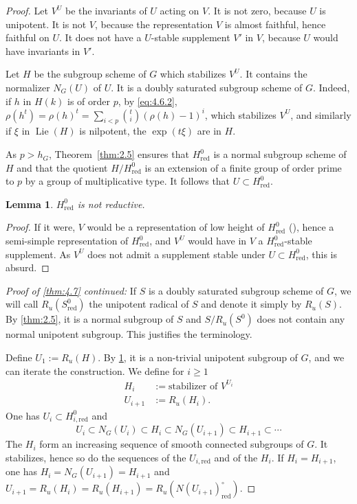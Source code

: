 \documentclass[11pt,a4paper]{article}
\theoremstyle{plain}
\newtheorem{lemma}[theorem]{Lemma}
\theoremstyle{definition}
\DeclareMathOperator{\Lie}{Lie}
\newcommand{\red}{\mathrm{red}}
\begin{document}
\begin{proof}
Let $V^U$ be the invariants of $U$ acting on $V$. It is not zero, because $U$ is unipotent. It is not $V$, because the representation $V$ is almost faithful, hence faithful on $U$. It does not have a $U$-stable supplement $V'$ in $V$, because $U$ would have invariants in $V'$.

Let $H$ be the subgroup scheme of $G$ which stabilizes $V^U$. It contains the normalizer $N_G(U)$ of $U$. It is a doubly saturated subgroup scheme of $G$. Indeed, if $h$ in $H(k)$ is of order $p$, by \eqref{eq:4.6.2}, $\rho(h^t) = \rho(h)^t = \sum_{i < p} \binom{t}{i} (\rho(h) - 1)^i$, which stabilizes $V^U$, and similarly if $\xi$ in $\Lie(H)$ is nilpotent, the $\exp(t\xi)$ are in $H$.

As $p > h_G$, Theorem~\ref{thm:2.5} ensures that $H^0_\red$ is a normal subgroup scheme of $H$ and that the quotient $H/H^0_\red$ is an extension of a finite group of order prime to $p$ by a group of multiplicative type. It follows that $U \subset H^0_\red$.

\begin{lemma} \label{lem:4.8}
$H^0_\red$ is not reductive.
\end{lemma}

\begin{proof}
If it were, $V$ would be a representation of low height of $H^0_\red$ (\cite[Corollary~1, page~25]{S2}), hence a semi-simple representation of $H^0_\red$, and $V^U$ would have in $V$ a $H^0_\red$-stable supplement. As $V^U$ does not admit a supplement stable under $U \subset H^0_\red$, this is absurd. \qedhere
\end{proof}

\textit{Proof of \ref{thm:4.7} continued:} If $S$ is a doubly saturated subgroup scheme of $G$, we will call $R_u(S^0_\red)$ the unipotent radical of $S$ and denote it simply by $R_u(S)$. By \ref{thm:2.5}, it is a normal subgroup of $S$ and $S/R_u(S^0)$ does not contain any normal unipotent subgroup. This justifies the terminology.

Define $U_1 := R_u(H)$. By \ref{lem:4.8}, it is a non-trivial unipotent subgroup of $G$, and we can iterate the construction. We define for $i \geq 1$
\begin{align*}
H_i &:= \text{stabilizer of } V^{U_i} \\
U_{i+1} &:= R_u(H_i).
\end{align*}
One has $U_i \subset H^0_{i,\red}$ and
\begin{equation} \label{eq:4.8.1}
U_i \subset N_G(U_i) \subset H_i \subset N_G(U_{i+1}) \subset H_{i+1} \subset \cdots
\end{equation}
The $H_i$ form an increasing sequence of smooth connected subgroups of $G$. It stabilizes, hence so do the sequences of the $U_{i,\red}$ and of the $H_i$. If $H_i = H_{i+1}$, one has $H_i = N_G(U_{i+1}) = H_{i+1}$ and $U_{i+1} = R_u(H_i) = R_u(H_{i+1}) = R_u(N(U_{i+1})^\circ_\red)$.


\end{proof}
\end{document}
